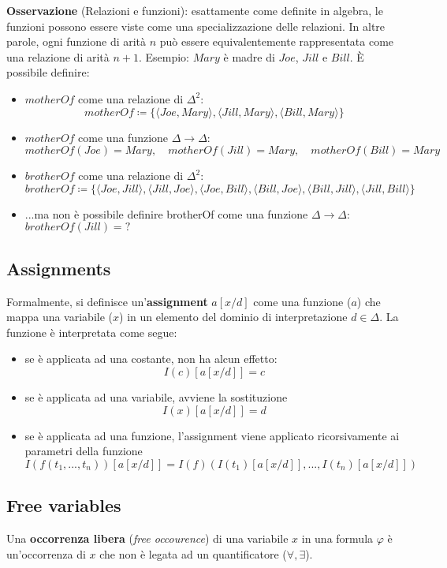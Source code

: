 \textbf{Osservazione} (Relazioni e funzioni): esattamente come definite in algebra, le funzioni possono essere viste come una specializzazione delle relazioni. In altre parole, ogni funzione di arità $n$ può essere equivalentemente rappresentata come una relazione di arità $n+1$. Esempio: $Mary$ è madre di $Joe$, $Jill$ e $Bill$. È possibile definire:
\begin{itemize}
\item $motherOf$ come una relazione di $\Delta^2$:
$$motherOf \coloneqq \lbrace \langle Joe, Mary \rangle, \langle Jill, Mary \rangle, \langle Bill, Mary \rangle \rbrace$$
\item $motherOf$ come una funzione $\Delta \to \Delta$: $$motherOf(Joe) = Mary, \quad motherOf(Jill) = Mary,\quad motherOf(Bill) = Mary$$
\item $brotherOf$ come una relazione di $\Delta^2$: $$brotherOf \coloneqq \lbrace \langle Joe, Jill \rangle, \langle Jill, Joe \rangle, \langle Joe, Bill \rangle , \langle Bill, Joe \rangle, \langle Bill, Jill \rangle, \langle Jill, Bill \rangle \rbrace$$
\item ...ma non è possibile definire brotherOf come una funzione $\Delta \to \Delta$: $brotherOf(Jill) = ?$
\end{itemize}

\subsection{Assignments}
Formalmente, si definisce un'\textbf{assignment} $a[x/d]$ come una funzione ($a$) che mappa una variabile ($x$) in un elemento del dominio di interpretazione $d \in \Delta$. La funzione è interpretata come segue:
\begin{itemize}
\item se è applicata ad una costante, non ha alcun effetto: $$I(c)[a[x/d]] = c$$
\item se è applicata ad una variabile, avviene la sostituzione $$I(x)[a[x/d]] = d$$
\item se è applicata ad una funzione, l'assignment viene applicato ricorsivamente ai parametri della funzione $$I(f(t_1, ..., t_n))[a[x/d]] = I(f)(I(t_1)[a[x/d]], ..., I(t_n)[a[x/d]])$$
\end{itemize}

\subsection{Free variables}
Una \textbf{occorrenza libera} (\textit{free occourence}) di una variabile $x$ in una formula $\varphi$ è un'occorrenza di $x$ che non è legata ad un quantificatore ($\forall, \exists$).
\\

